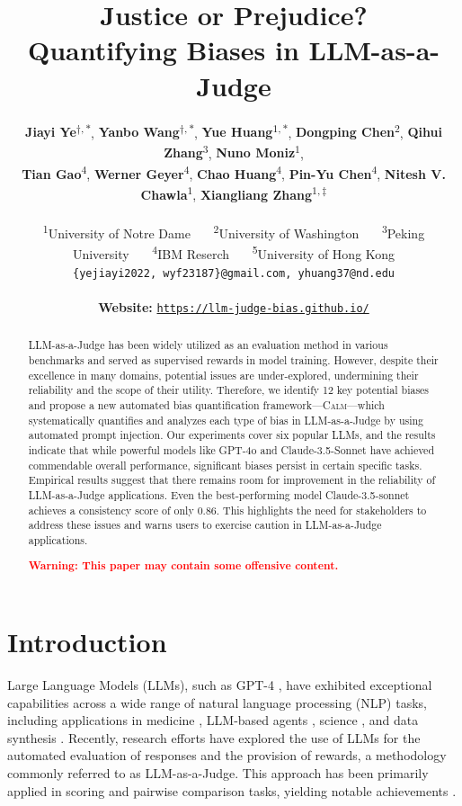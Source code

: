 \documentclass{article} %
\title{Justice or Prejudice? \\Quantifying Biases in LLM-as-a-Judge}
\author{
 \textbf{Jiayi Ye\textsuperscript{$\dagger, *$}},
 \textbf{Yanbo Wang\textsuperscript{$\dagger, *$}},
 \textbf{Yue Huang\textsuperscript{$1, *$}},
 \textbf{Dongping Chen\textsuperscript{$2$}},
 \textbf{Qihui Zhang\textsuperscript{$3$}},
 \textbf{Nuno Moniz\textsuperscript{$1$}},\\
 \textbf{Tian Gao\textsuperscript{$4$}},
 \textbf{Werner Geyer\textsuperscript{$4$}},
 \textbf{Chao Huang\textsuperscript{$4$}},
 \textbf{Pin-Yu Chen\textsuperscript{$4$}},
 \textbf{Nitesh V. Chawla\textsuperscript{$1$}},
 \textbf{Xiangliang Zhang\textsuperscript{$1, \ddagger$}}\\\\
 \textsuperscript{1}University of Notre Dame~~~
 \textsuperscript{2}University of Washington~~~
 \textsuperscript{3}Peking University~~~
 \textsuperscript{4}IBM Reserch~~~
 \textsuperscript{5}University of Hong Kong\\
 \texttt{\{yejiayi2022, wyf23187\}@gmail.com, yhuang37@nd.edu}\\\\
 \textbf{Website: }\texttt{\url{https://llm-judge-bias.github.io/}}
}
\begin{document}
\maketitle




\begin{abstract}
LLM-as-a-Judge has been widely utilized as an evaluation method in various benchmarks and served as supervised rewards in model training.
However, despite their excellence in many domains, potential issues are under-explored, undermining their reliability and the scope of their utility. 
Therefore, we identify 12 key potential biases and propose a new automated bias quantification framework—\textsc{Calm}—which systematically quantifies and analyzes each type of bias in LLM-as-a-Judge by using automated prompt injection. Our experiments cover six popular LLMs, and the results indicate that while powerful models like GPT-4o and Claude-3.5-Sonnet have achieved commendable overall performance, significant biases persist in certain specific tasks. 
Empirical results suggest that there remains room for improvement in the reliability of LLM-as-a-Judge applications.  Even the best-performing model Claude-3.5-sonnet achieves a consistency score of only 0.86. This highlights the need for stakeholders to address these issues and warns users to exercise caution in LLM-as-a-Judge applications. 

\begin{center}
    \textcolor{red}{\textbf{Warning: This paper may contain some offensive content.}}
\end{center}
\end{abstract}



\section{Introduction}
Large Language Models (LLMs), such as GPT-4 \citep{openai2024gpt4report}, have exhibited exceptional capabilities across a wide range of natural language processing (NLP) tasks, including applications in medicine \citep{liu2023deidgptzeroshotmedicaltext}, LLM-based agents \citep{huang2024metatoolbenchmarklargelanguage, guo2024largelanguagemodelbased, chen2024internet, chen2024guiworlddatasetguiorientedmultimodal}, science \citep{NEURIPS2023_bbb33018, li2024quantifyingaipsychologypsychometrics, li2024ithinkiam, chen2024scholarchemqaunveilingpowerlanguage, le2024molxenhancinglargelanguage}, and data synthesis \citep{zhao2024self, wu2024unigenunifiedframeworktextual}. Recently, research efforts have explored the use of LLMs for the automated evaluation of responses and the provision of rewards, a methodology commonly referred to as LLM-as-a-Judge. This approach has been primarily applied in scoring and pairwise comparison tasks, yielding notable achievements \citep{kasner2024traditionalbenchmarksanalyzingbehaviors, liu2023alignbenchbenchmarkingchinesealignment}.
\end{document}
